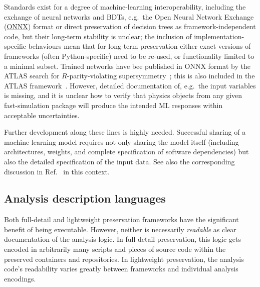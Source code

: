 \documentclass[11pt]{article}
\begin{document}
Standards exist for a degree of machine-learning interoperability, including the exchange of neural networks and BDTs, e.g.~the 
Open Neural Network Exchange (\href{https://github.com/onnx}{ONNX}) format or direct preservation of decision trees as framework-independent code, but their long-term stability is unclear; the inclusion of implementation-specific behaviours mean that for long-term preservation either exact versions of frameworks (often Python-specific) need to be re-used, or functionality limited to a minimal subset. Trained networks have bee published in ONNX format by the ATLAS search for $R$-parity-violating supersymmetry~\cite{ATLAS:2021fbt,hepdata.104860.v1/r3}; this is also included in the ATLAS \simpleanalysis framework~\cite{atlas:simpleanalysis}. 
However, detailed documentation of, e.g.~the input variables is missing, and it is unclear how to verify that physics objects from any given fast-simulation package will produce the intended ML responses within acceptable uncertainties.

Further development along these lines is highly needed. Successful sharing of a machine learning model requires not only sharing the model itself (including architectures, weights, and complete specification of software dependencies) but also the detailed specification of the input data. See also the corresponding discussion in Ref.~\cite{snowmass:MLevts} in this context.







\subsection{Analysis description languages}

Both full-detail and lightweight preservation frameworks have the significant benefit of being executable. %
However, neither is necessarily \emph{readable} as clear documentation of the analysis logic.
In full-detail preservation, this logic gets encoded in arbitrarily many scripts and pieces of source code within the preserved containers and repositories.
In lightweight preservation, the analysis code's readability varies greatly between frameworks and individual analysis encodings.
\end{document}
